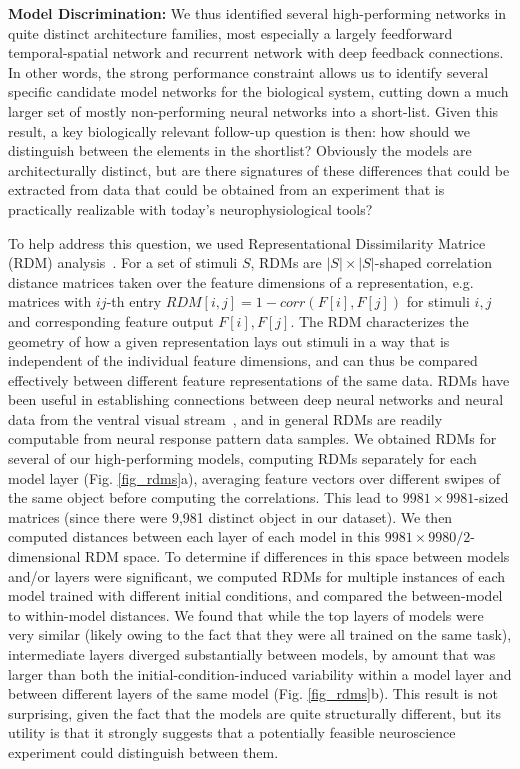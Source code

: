 \textbf{Model Discrimination:}  We thus identified several high-performing networks in quite distinct architecture families, most especially a largely feedforward temporal-spatial network and recurrent network with deep feedback connections.
In other words, the strong performance constraint allows us to identify several specific candidate model networks for the biological system, cutting down a much larger set of mostly non-performing neural networks into a short-list.
Given this result, a key biologically relevant follow-up question is then: how should we distinguish between the elements in the shortlist?
Obviously the models are architecturally distinct, but are there signatures of these differences that could be extracted from data that could be obtained from an experiment that is practically realizable with today's neurophysiological tools?

To help address this question, we used Representational Dissimilarity Matrice (RDM) analysis~\cite{Kriegeskorte2008}.
For a set of stimuli $S$, RDMs are $|S| \times |S|$-shaped correlation distance matrices taken over the feature dimensions of a representation, e.g. matrices with $ij$-th entry $RDM[i, j] = 1 - corr(F[i], F[j])$ for stimuli $i, j$ and corresponding feature output $F[i], F[j]$.
The RDM characterizes the geometry of how a given representation lays out stimuli in a way that is independent of the individual feature dimensions, and can thus be compared effectively between different feature representations of the same data.
RDMs have been useful in establishing connections between deep neural networks and neural data from the ventral visual stream~\cite{cadieu2014deep, Yamins2014, khaligh2014deep}, and in general RDMs are readily computable from neural response pattern data samples.
We obtained RDMs for several of our high-performing models, computing RDMs separately for each model layer (Fig. \ref{fig_rdms}a), averaging feature vectors over different swipes of the same object before computing the correlations.
This lead to $9981\times9981$-sized matrices (since there were 9,981 distinct object in our dataset).
We then computed distances between each layer of each model in this $9981\times9980/2$-dimensional RDM space.
To determine if differences in this space between models and/or layers were significant, we computed RDMs for multiple instances of each model trained with different initial conditions, and compared the between-model to within-model distances.
We found that while the top layers of models were very similar (likely owing to the fact that they were all trained on the same task), intermediate layers diverged substantially between models, by amount that was larger than both the initial-condition-induced variability within a model layer and between different layers of the same model (Fig. \ref{fig_rdms}b).
This result is not surprising, given the fact that the models are quite structurally different, but its utility is that it strongly suggests that a potentially feasible neuroscience experiment could distinguish between them.



